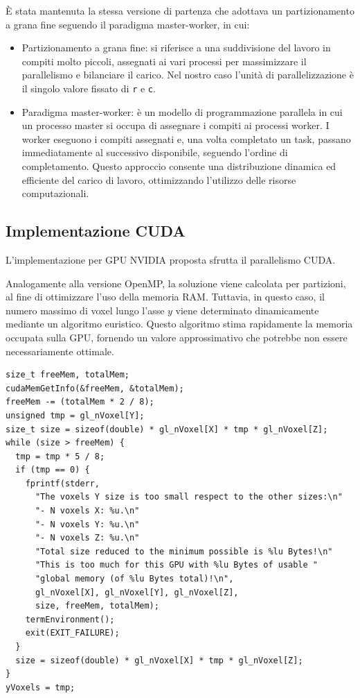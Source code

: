 \documentclass[12pt,a4paper]{report}
\begin{document}
È stata mantenuta la stessa versione di partenza che adottava un partizionamento a grana fine seguendo il paradigma master-worker,
in cui:
\begin{itemize}
  \item Partizionamento a grana fine: si riferisce a una suddivisione del lavoro in compiti molto piccoli, assegnati ai vari
        processi per massimizzare il parallelismo e bilanciare il carico.
        Nel nostro caso l'unità di parallelizzazione è il singolo valore fissato di \lstinline{r} e \mbox{\lstinline{c}.}
  \item Paradigma master-worker: è un modello di programmazione parallela in cui un processo master si occupa di assegnare i
        compiti ai processi worker.
        I worker eseguono i compiti assegnati e, una volta completato un task, passano immediatamente al successivo disponibile,
        seguendo l'ordine di completamento.
        Questo approccio consente una distribuzione dinamica ed efficiente del carico di lavoro, ottimizzando l'utilizzo delle
        risorse computazionali.
\end{itemize}

\subsection{Implementazione CUDA}

L'implementazione per GPU NVIDIA proposta sfrutta il parallelismo CUDA.

Analogamente alla versione OpenMP, la soluzione viene calcolata per partizioni, al fine di ottimizzare l'uso della memoria RAM.
Tuttavia, in questo caso, il numero massimo di voxel lungo l'asse \(y\) viene determinato dinamicamente mediante un algoritmo
euristico.
Questo algoritmo stima rapidamente la memoria occupata sulla GPU, fornendo un valore approssimativo che potrebbe non essere
necessariamente ottimale.

\begin{lstlisting}[language=CStyle, caption={Codice CUDA-C per il calcolo del numero massimo di voxel sull'asse \(y\).}, label={lst:cuda_y_max}]
size_t freeMem, totalMem;
cudaMemGetInfo(&freeMem, &totalMem);
freeMem -= (totalMem * 2 / 8);
unsigned tmp = gl_nVoxel[Y];
size_t size = sizeof(double) * gl_nVoxel[X] * tmp * gl_nVoxel[Z];
while (size > freeMem) {
  tmp = tmp * 5 / 8;
  if (tmp == 0) {
    fprintf(stderr,
      "The voxels Y size is too small respect to the other sizes:\n"
      "- N voxels X: %u.\n"
      "- N voxels Y: %u.\n"
      "- N voxels Z: %u.\n"
      "Total size reduced to the minimum possible is %lu Bytes!\n"
      "This is too much for this GPU with %lu Bytes of usable "
      "global memory (of %lu Bytes total)!\n",
      gl_nVoxel[X], gl_nVoxel[Y], gl_nVoxel[Z],
      size, freeMem, totalMem);
    termEnvironment();
    exit(EXIT_FAILURE);
  }
  size = sizeof(double) * gl_nVoxel[X] * tmp * gl_nVoxel[Z];
}
yVoxels = tmp;
\end{lstlisting}
\end{document}
